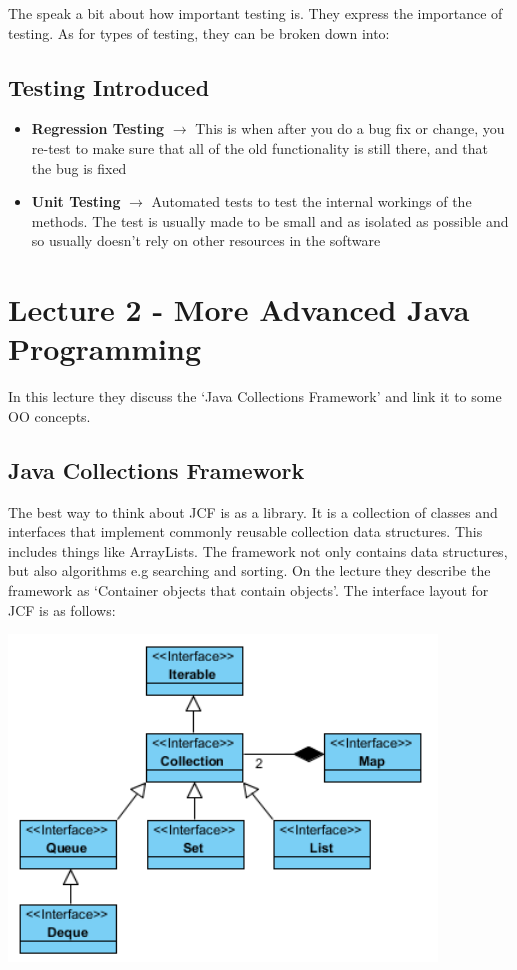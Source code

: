 \documentclass{article}
\begin{document}
The speak a bit about how important testing is. They express the importance of testing. As for types of testing, they can be broken down into:

\subsection{Testing Introduced}

\begin{itemize}
    \item \textbf{Regression Testing} $\longrightarrow$ This is when after you do a bug fix or change, you re-test to make sure that all of the old functionality is still there, and that the bug is fixed
    \item \textbf{Unit Testing} $\longrightarrow$ Automated tests to test the internal workings of the methods. The test is usually made to be small and as isolated as possible and so usually doesn't rely on other resources in the software
\end{itemize}

\section{Lecture 2 - More Advanced Java Programming}

In this lecture they discuss the `Java Collections Framework' and link it to some OO concepts.

\subsection{Java Collections Framework}

The best way to think about JCF is as a library. It is a collection of classes and interfaces that implement commonly reusable collection data structures. This includes things like ArrayLists. The framework not only contains data structures, but also algorithms e.g searching and sorting. On the lecture they describe the framework as `Container objects that contain objects'. The interface layout for JCF is as follows:

\includegraphics[scale = 0.8]{jcmLayout}
\end{document}

